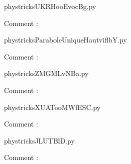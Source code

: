 
    \newcommand{\CaptionFigUKRHooEvocBg}{<+Type your caption here+>}
    \begin{center}
        
    \end{center}
    phystricksUKRHooEvocBg.py

    Comment : 

    \clearpage
    


    \newcommand{\CaptionFigParaboleUniqueHautviflbY}{<+Type your caption here+>}
    \begin{center}
        
    \end{center}
    phystricksParaboleUniqueHautviflbY.py

    Comment : 

    \clearpage
    


    \newcommand{\CaptionFigZMGMLvNBa}{<+Type your caption here+>}
    \begin{center}
        
    \end{center}
    phystricksZMGMLvNBa.py

    Comment : 

    \clearpage
    


    \newcommand{\CaptionFigXUATooMWfESC}{<+Type your caption here+>}
    \begin{center}
        
    \end{center}
    phystricksXUATooMWfESC.py

    Comment : 

    \clearpage
    


    \newcommand{\CaptionFigJLUTBlD}{<+Type your caption here+>}
    \begin{center}
        
    \end{center}
    phystricksJLUTBlD.py

    Comment : 

    \clearpage
    


